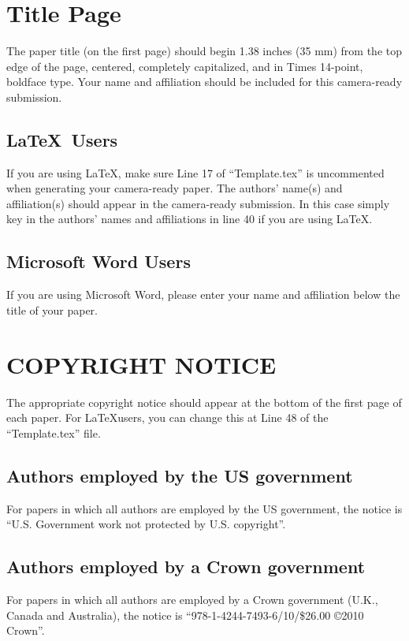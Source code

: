 \documentclass{article}
\begin{document}
\section{Title Page}
\label{sec:pagestyle}

The paper title (on the first page) should begin 1.38 inches (35 mm)
from the top edge of the page, centered, completely capitalized, and
in Times 14-point, boldface type. Your name and affiliation should
be included for this camera-ready submission.



\subsection{\LaTeX~Users}
If you are using \LaTeX, make sure Line 17 of ``Template.tex'' is
uncommented when generating your camera-ready paper. The authors'
name(s) and affiliation(s) should appear in the camera-ready
submission. In this case simply key in the authors' names and
affiliations in line 40 if you are using \LaTeX.

\subsection{Microsoft Word Users}
If you are using Microsoft Word, please enter your name and
affiliation below the title of your paper.

\section{COPYRIGHT NOTICE}
The appropriate copyright notice should appear at the bottom of the
first page of each paper. For \LaTeX users, you can change this at
Line 48 of the ``Template.tex'' file.

\subsection{Authors employed by the US government}
For papers in which all authors are employed by the US government,
the notice is ``U.S. Government work not protected by U.S.
copyright''.

\subsection{Authors employed by a Crown government}
For papers in which all authors are employed by a Crown government
(U.K., Canada and Australia), the notice is
``978-1-4244-7493-6/10/\$26.00 \copyright2010 Crown''.
\end{document}
